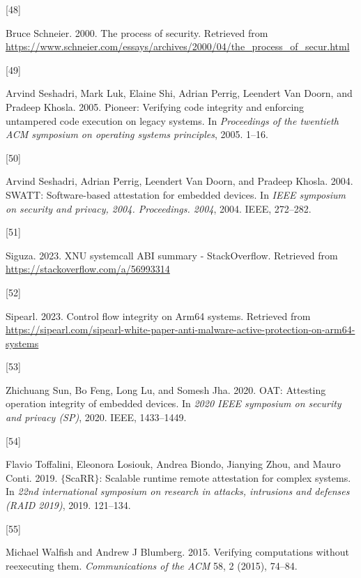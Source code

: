 \documentclass[a4paper, nobind]{templates/ociamthesis}
\newlength{\cslhangindent}
\newlength{\csllabelwidth}
\newenvironment{CSLReferences}[2] %
{\begin{list}{}{%
	\setlength{\itemindent}{0pt}
	\setlength{\leftmargin}{0pt}
	\setlength{\parsep}{0pt}
	\ifodd #1
	\setlength{\leftmargin}{\cslhangindent}
	\setlength{\itemindent}{-1\cslhangindent}
	\fi
	\setlength{\itemsep}{#2\baselineskip}}}
{\end{list}}
\newcommand{\CSLLeftMargin}[1]{\parbox[t]{\csllabelwidth}{\strut#1\strut}}
\newcommand{\CSLRightInline}[1]{\parbox[t]{\linewidth - \csllabelwidth}{\strut#1\strut}}
\begin{document}
\begin{CSLReferences}{0}{0}
\CSLLeftMargin{{[}48{]} }%
\CSLRightInline{Bruce Schneier. 2000. The process of security. Retrieved from \url{https://www.schneier.com/essays/archives/2000/04/the_process_of_secur.html}}

\CSLLeftMargin{{[}49{]} }%
\CSLRightInline{Arvind Seshadri, Mark Luk, Elaine Shi, Adrian Perrig, Leendert Van Doorn, and Pradeep Khosla. 2005. Pioneer: Verifying code integrity and enforcing untampered code execution on legacy systems. In \emph{Proceedings of the twentieth ACM symposium on operating systems principles}, 2005. 1--16.}

\CSLLeftMargin{{[}50{]} }%
\CSLRightInline{Arvind Seshadri, Adrian Perrig, Leendert Van Doorn, and Pradeep Khosla. 2004. SWATT: Software-based attestation for embedded devices. In \emph{IEEE symposium on security and privacy, 2004. Proceedings. 2004}, 2004. IEEE, 272--282.}

\CSLLeftMargin{{[}51{]} }%
\CSLRightInline{Siguza. 2023. XNU systemcall ABI summary - StackOverflow. Retrieved from \url{https://stackoverflow.com/a/56993314}}

\CSLLeftMargin{{[}52{]} }%
\CSLRightInline{Sipearl. 2023. Control flow integrity on Arm64 systems. Retrieved from \url{https://sipearl.com/sipearl-white-paper-anti-malware-active-protection-on-arm64-systems}}

\CSLLeftMargin{{[}53{]} }%
\CSLRightInline{Zhichuang Sun, Bo Feng, Long Lu, and Somesh Jha. 2020. OAT: Attesting operation integrity of embedded devices. In \emph{2020 IEEE symposium on security and privacy (SP)}, 2020. IEEE, 1433--1449.}

\CSLLeftMargin{{[}54{]} }%
\CSLRightInline{Flavio Toffalini, Eleonora Losiouk, Andrea Biondo, Jianying Zhou, and Mauro Conti. 2019. \(\{\)ScaRR\(\}\): Scalable runtime remote attestation for complex systems. In \emph{22nd international symposium on research in attacks, intrusions and defenses (RAID 2019)}, 2019. 121--134.}

\CSLLeftMargin{{[}55{]} }%
\CSLRightInline{Michael Walfish and Andrew J Blumberg. 2015. Verifying computations without reexecuting them. \emph{Communications of the ACM} 58, 2 (2015), 74--84.}


\end{CSLReferences}
\end{document}

